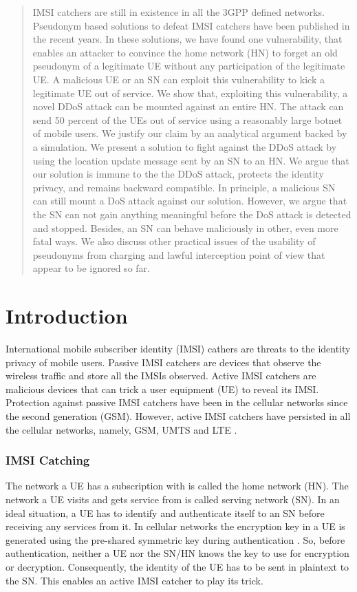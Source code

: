 \documentclass{llncs} %
\begin{document}
\begin{abstract}
IMSI catchers are still in existence in all the 3GPP defined networks. Pseudonym based solutions to defeat IMSI catchers have been published in the recent years. In these solutions, we have found one vulnerability, that enables an attacker to convince the home network (HN) to forget an old pseudonym of a legitimate UE without any participation of the legitimate UE. A malicious UE or an SN can exploit this vulnerability to kick a legitimate UE out of service. We show that, exploiting this vulnerability, a novel DDoS attack can be mounted against an entire HN. The attack can send 50 percent of the UEs out of service using a reasonably large botnet of mobile users. We justify our claim by an analytical argument backed by a simulation. We present a solution to fight against the DDoS attack by using the location update message sent by an SN to an HN. We argue that our solution is immune to the the DDoS attack, protects the identity privacy, and remains backward compatible. In principle, a malicious SN can still mount a DoS attack against our solution. However, we argue that the SN can not gain anything meaningful before the DoS attack is detected and stopped. Besides, an SN can behave maliciously in other, even more fatal ways. We also discuss other practical issues of the usability of pseudonyms from charging and lawful interception point of view that appear to be ignored so far.
\end{abstract}


\section{Introduction} \label{intro}
International mobile subscriber identity (IMSI) cathers are threats to the identity privacy of mobile users. Passive IMSI catchers are devices that observe the wireless traffic and store all the IMSIs observed. Active IMSI catchers are malicious devices that can trick a user equipment (UE) to reveal its IMSI. Protection against passive IMSI catchers have been in the cellular networks since the second generation (GSM). However, active IMSI catchers have persisted in all the cellular networks, namely, GSM, UMTS and LTE \cite{mobicom95,imsi_catcher_report_bochum,Ginzboorg_Niemi_2016,washingtonpost2014,pets2017,pki_umts_imsi_catcher}. 

\subsubsection{IMSI Catching}
The network a UE has a subscription with is called the home network (HN). The network a UE visits and gets service from is called serving network (SN). In an ideal situation, a UE has to identify and authenticate itself to an SN before receiving any services from it. In cellular networks the encryption key in a UE is generated using the pre-shared symmetric key during authentication \cite{TS33401}. So, before authentication, neither a UE nor the SN/HN knows the key to use for encryption or decryption.  Consequently, the identity of the UE has to be sent in plaintext to the SN. This enables an active IMSI catcher to play its trick.
\end{document}
